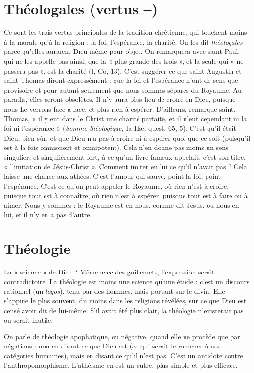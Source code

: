 \section{Théologales (vertus {\bf --})}
Ce sont les trois vertus principales de la tradition
chrétienne, qui touchent moins à la
morale qu’à la religion : la foi, l'espérance, la charité. On les dit {\it théologales}
parce qu’elles auraient Dieu même pour objet. On remarquera avec saint Paul,
qui ne les appelle pas ainsi, que la « plus grande des trois », et la seule qui « ne
passera pas », est la charité (I, Co, 13). C’est suggérer ce que saint Augustin et
saint Thomas diront expressément : que la foi et l'espérance n’ont de sens que
provisoire et pour autant seulement que nous sommes séparés du Royaume. Au
paradis, elles seront obsolètes. Il n’y aura plus lieu de croire en Dieu, puisque
nous Le verrons face à face, et plus rien à espérer. D'ailleurs, remarque saint.
Thomas, « il y eut dans le Christ une charité parfaite, et il n’eut cependant ni
la foi ni l'espérance » ({\it Somme théologique}, Ia IIæ, quest. 65, 5). C’est qu’il était
Dieu, bien sûr, et que Dieu n’a pas à croire ni à espérer quoi que ce soit
(puisqu'il est à la fois omniscient et omnipotent). Cela n’en donne pas moins
un sens singulier, et singulièrement fort, à ce qu’un livre fameux appelait, c’est
son titre, « l'imitation de Jésus-Christ ». Comment imiter en lui ce qu’il n’avait
pas ? Cela laisse une chance aux athées. C’est l’amour qui sauve, point la foi,
point l'espérance. C’est ce qu’on peut appeler le Royaume, où rien n’est à
croire, puisque tout est à connaître, où rien n’est à espérer, puisque tout est à
faire ou à aimer. Nous y sommes : le Royaume est en nous, comme dit Jésus,
ou nous en lui, et il n’y en a pas d’autre.

\section{Théologie}
La « science » de Dieu ? Même avec des guillemets, l’expression
serait contradictoire. La théologie est moins une science
qu'une étude : c’est un discours rationnel (un {\it logos}), tenu par des hommes,
mais portant sur le divin. Elle s’appuie le plus souvent, du moins dans les religions
révélées, sur ce que Dieu est censé avoir dit de lui-même. S'il avait été
plus clair, la théologie n’existerait pas ou serait inutile.

On parle de théologie apophatique, ou négative, quand elle ne procède
que par négations : non en disant ce que Dieu est (ce qui serait le ramener à
nos catégories humaines), mais en disant ce qu’il n’est pas. C’est un antidote
contre l’anthropomorphisme. L’athéisme en est un autre, plus simple et plus
efficace.

